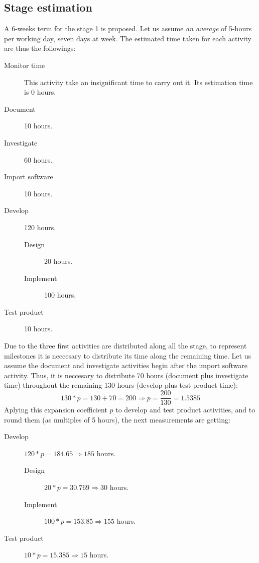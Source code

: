 \documentclass[twocolumn, 9pt]{extarticle}
\begin{document}
\subsection{Stage estimation}
\label{ssec:estimation}
A 6-weeks term for the stage 1 is proposed. Let us assume \textit{an average}
of 5-hours per working day, seven days at week. The estimated time taken
for each activity are thus the followings:

\begin{description}
\item[Monitor time] This activity take an insignificant time to carry
  out it. Its estimation time is 0 hours.
\item[Document] 10 hours.
\item[Investigate] 60 hours.
\item[Import software] 10 hours.
\item[Develop] 120 hours.
  \begin{description}
  \item[Design] 20 hours.
  \item[Implement] 100 hours.
  \end{description}
\item[Test product] 10 hours.
\end{description}

Due to the three first activities are distributed along all the stage,
to represent milestones it is neccesary to distribute its time along
the remaining time. Let us assume the document and investigate
activities begin after the import software activity. Thus, it is
neccesary to distribute 70 hours (document plus investigate time)
throughout the remaining 130 hours (develop plus test product
time): \[ 130 * p = 130 + 70 = 200 \Rightarrow p = \frac{200}{130} =
1.5385 \] Aplying this expansion coefficient $p$ to develop and test
product activities, and to round them (as multiples of 5 hours), the
next measurements are getting:

\begin{description}
  \item[Develop] $120 * p = 184.65 \Rightarrow 185$ hours.
    \begin{description}
      \item[Design] $20 * p = 30.769 \Rightarrow 30$ hours.
      \item[Implement] $100 * p = 153.85 \Rightarrow 155$ hours.
    \end{description}
  \item[Test product] $10 * p = 15.385 \Rightarrow 15$ hours.
\end{description}
\end{document}
